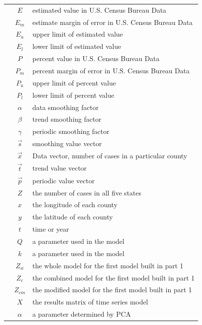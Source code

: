 \documentclass{mcmthesis}
\newcounter{rowno}
\numberwithin{equation}{section}
\numberwithin{figure}{section}
\numberwithin{table}{section}
\theoremstyle{mydef}
\begin{document}
\begin{center}
\begin{table}[H]
\begin{tabular}{>{\stepcounter{rowno}\therowno}ccl}
& $ E $    & estimated value in U.S. Census Bureau Data \\
& $E_m$ &    estimate margin of error in U.S. Census Bureau Data\\
& $E_u$  &  upper limit of estimated value\\
& $E_l$& lower limit of estimated value\\
& $P$& percent value in U.S. Census Bureau Data\\
& $P_m$&  percent margin of error in U.S. Census Bureau Data\\
& $P_u$& upper limit of percent value\\
& $P_l$& lower limit of percent value\\
& $\alpha$& data smoothing factor\\
& $\beta$& trend smoothing factor\\
& $\gamma$& periodic smoothing factor\\
& $\vec{s}$ &  smoothing value vector\\
& $\vec{x}$ & Data vector, number of cases in a particular county\\
& $\vec{t}$ & trend value vector\\
& $\vec{p}$ & periodic value vector\\
& $Z$ & the number of cases in all five states \\
& $x $ & the longitude of each county\\
& $y $ & the latitude of each county\\
& $ t$ & time or year\\
& $ Q$ & a parameter used in the model\\
& $ k$ & a parameter used in the model\\
& $Z_w $ & the whole model for the first model built in part 1\\
& $Z_c $ & the combined model for the first model built in part 1\\
& $ Z_{cm}$& the modified model for the first model built in part 1 \\
& $X $ & the results matrix of time series model\\
& $ \alpha$ & a parameter determined by PCA\\
\bottomrule[1.5pt]
\end{tabular}
\end{table}
\end{center}
\vspace{-1cm}
\end{document}
